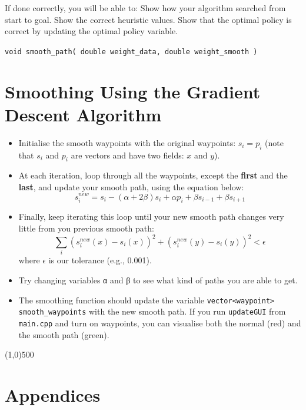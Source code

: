 \documentclass[twoside,11pt]{article}
\begin{document}
If done correctly, you will be able to: Show how your algorithm searched from start to goal. Show the
correct heuristic values. Show that the optimal policy is correct by updating the optimal policy
variable.

\texttt{void smooth\_path( double weight\_data, double weight\_smooth )}



\section*{Smoothing Using the Gradient Descent Algorithm}
\begin{itemize}
	\item Initialise the smooth waypoints with the original waypoints: $s_i = p_i$ (note that $s_i$ and $p_i$ are
	vectors and have two fields: $x$ and $y$).
	\item At each iteration, loop through all the waypoints, except the \textbf{first} and the \textbf{last}, and update
	your smooth path, using the equation below:
	\begin{equation*}
	s_i^{new} = s_i − (\alpha + 2\beta)s_i + \alpha p_i + \beta s_{i−1} + \beta s_{i+1} 
	\end{equation*} 
	\item Finally, keep iterating this loop until your new smooth path changes very little from you
	previous smooth path:
	\begin{equation*}
	\sum_i (s_i^{new}(x) − s_i(x))^2 + (s_i^{new}(y) − s_i(y))^2 < \epsilon
	\end{equation*}	
	where $\epsilon$ is our tolerance (e.g., 0.001).
	\item Try changing variables α and β to see what kind of paths you are able to get.
	\item The smoothing function should update the variable \texttt{vector<waypoint> smooth\_waypoints}
	with the new smooth path. If you run \texttt{updateGUI} from \texttt{main.cpp} and turn on waypoints, you
	can visualise both the normal (red) and the smooth path (green).
\end{itemize}

\begin{center}
	\line(1,0){500}
\end{center}

\section*{Appendices}
\end{document}
